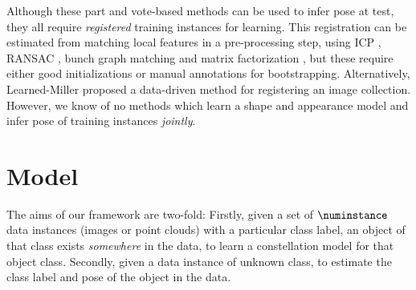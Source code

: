 Although these part and vote-based methods can be used to infer pose at test, they all require \emph{registered} training instances for learning. 
This registration can be estimated from matching local features in a pre-processing step, using ICP \cite{Pham2011}, RANSAC \cite{Moreels2007}, bunch graph matching \cite{Wiskott1997} and matrix factorization \cite{Arie-Nachimson2009}, but these require either good initializations or manual annotations for bootstrapping. Alternatively, Learned-Miller \cite{Learned-Miller2006} proposed a data-driven method for registering an image collection. However, we know of no methods which learn a shape and appearance model and infer pose of training instances \emph{jointly}.





\section{Model}
\label{sec:framework}
The aims of our framework are two-fold:
Firstly, given a set of $\numinstance$ data instances (\eg images or point clouds) with a particular class label, \ie an object of that class exists \emph{somewhere} in the data, to learn a constellation model for that object class.
Secondly, given a data instance of unknown class, to estimate the class label and pose of the object in the data.

